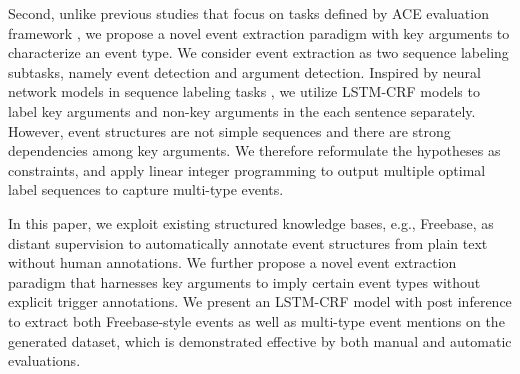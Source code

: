 Second, unlike previous studies that focus on tasks defined by ACE evaluation framework \cite{ahn2006stages,li2013joint,chen2015event,nguyen2016joint}, we propose a novel event extraction paradigm with key arguments to characterize an event type. We consider event extraction as two sequence labeling subtasks, namely event detection and argument detection. Inspired by neural network models in sequence labeling tasks \cite{huang2015bidirectional,lample2016neural}, we utilize LSTM-CRF models to label key arguments and non-key arguments in the each sentence separately. However, event structures are not simple sequences and there are strong dependencies among key arguments. We therefore reformulate the hypotheses as constraints, and apply linear integer programming to output multiple optimal label sequences to capture multi-type events.

In this paper, we exploit existing structured knowledge bases, e.g., Freebase, as distant supervision to automatically annotate event structures from plain text without human annotations. We further propose a novel event extraction paradigm that harnesses key arguments to imply certain event types without explicit trigger annotations. We present an LSTM-CRF model with post inference to extract both Freebase-style events as well as multi-type event mentions on the generated dataset, which is demonstrated effective by both manual and automatic evaluations.
